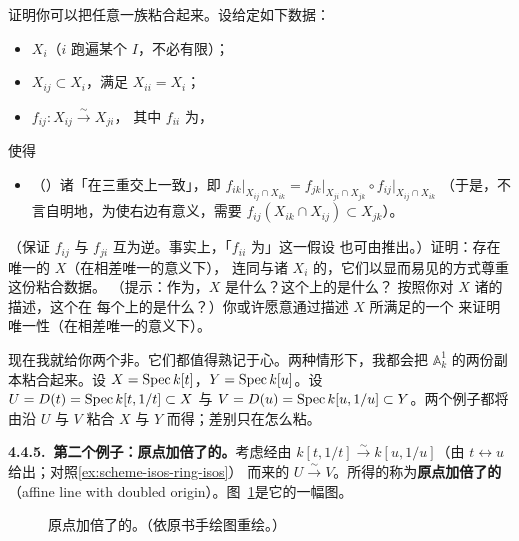 \begin{exercise}\label{ex:glue-arbitrary-schemes}
证明你可以把任意一族\trScheme{}粘合起来。设给定如下数据：
\begin{itemize}
\item \trScheme{} $X_i$（$i$ 跑遍某个\trIndexSet{} $I$，不必有限）；
\item \trOpenSubscheme{} $X_{ij}\subset X_i$，满足 $X_{ii}=X_i$；
\item \trIsomorphism{} $f_{ij}\colon X_{ij}\overset{\sim}{\longrightarrow}X_{ji}$，
      其中 $f_{ii}$ 为\trIdMorphism，
\end{itemize}
使得
\begin{itemize}
\item （\trCocycleCondition）诸\trIsomorphism{}「在三重交上一致」，即%
$f_{ik}\big|_{X_{ij}\cap X_{ik}}=f_{jk}\big|_{X_{ji}\cap X_{jk}}\circ f_{ij}\big|_{X_{ij}\cap X_{ik}}$%
（于是，不言自明地，为使右边有意义，需要 $f_{ij}(X_{ik}\cap X_{ij})\subset X_{jk}$）。
\end{itemize}
（\trCocycleCondition{}保证 $f_{ij}$ 与 $f_{ji}$ 互为逆。事实上，「$f_{ii}$ 为\trIdMorphism」这一假设%
也可由\trCocycleCondition{}推出。）证明：存在唯一的\trScheme{} $X$（在相差唯一\trIsomorphism{}的意义下），%
连同与诸 $X_i$ \trIsomorphic{}的\trOpenSubscheme{}，它们以显而易见的方式尊重这份粘合数据。%
（提示：作为\trSet，$X$ 是什么？这个\trSet{}上的\trTopology{}是什么？%
按照你对 $X$ 诸\trOpenSet{}的描述，这个\trSheaf{}在%
每个\trOpenSet{}上的\trSection{}是什么？）你或许愿意通过描述 $X$ 所满足的一个\trUniversalProperty{}%
来证明唯一性（在相差唯一\trIsomorphism{}的意义下）。
\end{exercise}

现在我就给你两个非\trAffineScheme。它们都值得熟记于心。两种情形下，我都会把\trAffineLine{} $\mathbb{A}^1_k$%
的两份副本粘合起来。设 $X=\operatorname{Spec} k[t]$，$Y=\operatorname{Spec} k[u]$。设 $U=D(t)=\operatorname{Spec} k[t,1/t]\subset X$ 与%
$V=D(u)=\operatorname{Spec} k[u,1/u]\subset Y$。两个例子都将由沿 $U$ 与 $V$ 粘合 $X$ 与 $Y$ 而得；差别只在怎么粘。

\textbf{4.4.5.\ 第二个例子：原点加倍了的\trAffineLine。}\quad 考虑经由\trIsomorphism{}%
$k[t,1/t]\overset{\sim}{\longrightarrow}k[u,1/u]$（由 $t\longleftrightarrow u$ 给出；对照\cref{ex:scheme-isos-ring-isos}）%
而来的 $U\overset{\sim}{\longrightarrow}V$。所得的\trScheme{}称为\textbf{原点加倍了的\trAffineLine}%
（affine line with doubled origin）。图~\ref{fig:affine-line-doubled-origin}是它的一幅图。

\begin{figure}[htbp]
\centering
{}
\caption{原点加倍了的\trAffineLine{}。（依原书手绘图重绘。）}%
\label{fig:affine-line-doubled-origin}
\end{figure}

